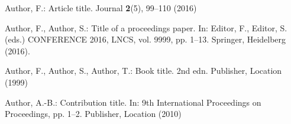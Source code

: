 \documentclass[runningheads]{llncs}
\begin{document}
\begin{thebibliography}{8}
Author, F.: Article title. Journal \textbf{2}(5), 99--110 (2016)

Author, F., Author, S.: Title of a proceedings paper. In: Editor,
F., Editor, S. (eds.) CONFERENCE 2016, LNCS, vol. 9999, pp. 1--13.
Springer, Heidelberg (2016). 

Author, F., Author, S., Author, T.: Book title. 2nd edn. Publisher,
Location (1999)

Author, A.-B.: Contribution title. In: 9th International Proceedings
on Proceedings, pp. 1--2. Publisher, Location (2010)

\end{thebibliography}
\end{document}
